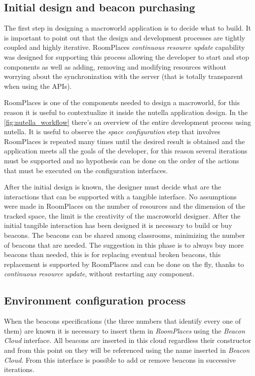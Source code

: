 \subsection{Initial design and beacon purchasing}
The first step in designing a macroworld application is to decide what to build. It is important to point out that the design and development processes are tightly coupled and highly iterative. RoomPlaces \textit{continuous resource update} capability was designed for supporting this process allowing the developer to start and stop components as well as adding, removing and modifying resources without worrying about the synchronization with the server (that is totally transparent when using the APIs).

RoomPlaces is one of the components needed to design a macroworld, for this reason it is useful to contextualize it inside the nutella application design. In the \ref{fig:nutella_workflow} there's an overview of the entire development process using nutella. It is useful to observe the \textit{space configuration} step that involves RoomPlaces is repeated many times until the desired result is obtained and the application meets all the goals of the developer, for this reason several iterations must be supported and no hypothesis can be done on the order of the actions that must be executed on the configuration interfaces.

After the initial design is known, the designer must decide what are the interactions that can be supported with a tangible interface. No assumptions were made in RoomPlaces on the number of resources and the dimension of the tracked space, the limit is the creativity of the macroworld designer. After the initial tangible interaction has been designed it is necessary to build or buy beacons. The beacons can be shared among classrooms, minimizing the number of beacons that are needed. The suggestion in this phase is to always buy more beacons than needed, this is for replacing eventual broken beacons, this replacement is supported by RoomPlaces and can be done on the fly, thanks to \textit{continuous resource update}, without restarting any component.

\subsection{Environment configuration process}
When the beacons specifications (the three numbers that identify every one of them) are known it is necessary to insert them in \textit{RoomPlaces} using the \textit{Beacon Cloud} interface. All beacons are inserted in this cloud regardless their constructor and from this point on they will be referenced using the name inserted in \textit{Beacon Cloud}. From this interface is possible to add or remove beacons in successive iterations.

